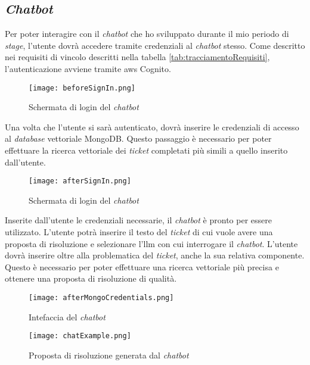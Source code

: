 \subsection*{\textit{Chatbot}}
Per poter interagire con il \textit{chatbot} che ho sviluppato durante il mio periodo di \textit{stage}, l'utente dovrà accedere tramite credenziali al \textit{chatbot} stesso. 
Come descritto nei requisiti di vincolo descritti nella tabella \ref{tab:tracciamentoRequisiti}, l'autenticazione avviene tramite \gls{aws} Cognito. 
\begin{figure}[H]
    \centering
    \texttt{[image: beforeSignIn.png]}
    \caption{Schermata di login del \textit{chatbot}}
    \label{fig:loginChatbot}
\end{figure}
\noindent
Una volta che l'utente si sarà autenticato, dovrà inserire le credenziali di accesso al \textit{database} vettoriale MongoDB. Questo passaggio è necessario per poter effettuare la ricerca vettoriale dei \textit{ticket} completati più simili a quello inserito dall'utente.
\begin{figure}[H]
    \centering
    \texttt{[image: afterSignIn.png]}
    \caption{Schermata di login del \textit{chatbot}}
    \label{fig:afterSignIn}
\end{figure}
\noindent
Inserite dall'utente le credenziali necessarie, il \textit{chatbot} è pronto per essere utilizzato. L'utente potrà inserire il testo del \textit{ticket} di cui vuole avere una proposta di risoluzione e selezionare l'\gls{llm} con cui interrogare il \textit{chatbot}. L'utente dovrà inserire oltre alla problematica del \textit{ticket}, anche la sua relativa componente. Questo è necessario per poter effettuare una ricerca vettoriale più precisa e ottenere una proposta di risoluzione di qualità.
\begin{figure}[H]
    \centering
    \texttt{[image: afterMongoCredentials.png]}
    \caption{Intefaccia del \textit{chatbot} }
    \label{fig:chatbot}
\end{figure}

\begin{figure} [H]
    \centering
    \texttt{[image: chatExample.png]}
    \caption{Proposta di risoluzione generata dal \textit{chatbot}}
    \label{fig:chatbotResponse}
\end{figure}

